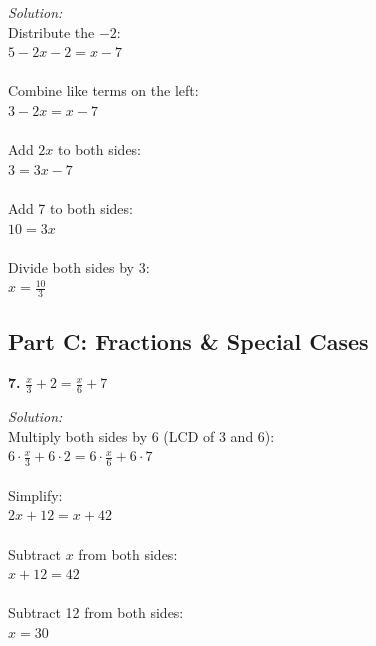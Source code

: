 \documentclass[12pt]{article}
\begin{document}
                \textit{Solution:}\\
                Distribute the $-2$:\\
                $5 - 2x - 2 = x - 7$\\
                \\
                Combine like terms on the left:\\
                $3 - 2x = x - 7$\\
                \\
                Add $2x$ to both sides:\\
                $3 = 3x - 7$\\
                \\
                Add 7 to both sides:\\
                $10 = 3x$\\
                \\
                Divide both sides by 3:\\
                $x = \frac{10}{3}$


                \newpage

        \subsection*{Part C: Fractions \& Special Cases}

            \textbf{7.} $\frac{x}{3} + 2 = \frac{x}{6} + 7$

                \textit{Solution:}\\
                Multiply both sides by 6 (LCD of 3 and 6):\\
                $6 \cdot \frac{x}{3} + 6 \cdot 2 = 6 \cdot \frac{x}{6} + 6 \cdot 7$\\
                \\
                Simplify:\\
                $2x + 12 = x + 42$\\
                \\
                Subtract $x$ from both sides:\\
                $x + 12 = 42$\\
                \\
                Subtract 12 from both sides:\\
                $x = 30$

\end{document}
